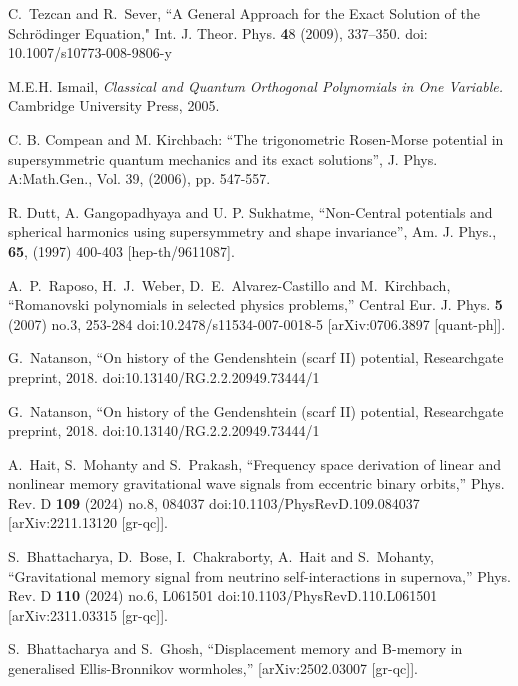 \documentclass[preprint,showpacs,preprintnumbers,amsmath,amssymb,nofootinbib]{revtex4}
\begin{document}
\begin{thebibliography}{99}
C.~Tezcan and R.~Sever, ``A General Approach for the Exact Solution of the Schr\"{o}dinger Equation," Int. J. Theor. Phys. {\textbf 48} (2009), 337–350. 
doi: 10.1007/s10773-008-9806-y

M.E.H. Ismail, {\sl Classical and Quantum Orthogonal Polynomials in One Variable.} Cambridge University Press, 2005.

C. B. Compean and M. Kirchbach: ``The trigonometric Rosen-Morse potential in supersymmetric quantum mechanics and its exact solutions'', J. Phys. A:Math.Gen., Vol. 39, (2006), pp. 547-557.

R. Dutt, A. Gangopadhyaya and U. P. Sukhatme,
``Non-Central potentials and spherical harmonics using supersymmetry and shape invariance'', Am. J. Phys., \textbf{65}, (1997) 400-403 [hep-th/9611087].

A.~P.~Raposo, H.~J.~Weber, D.~E.~Alvarez-Castillo and M.~Kirchbach,
``Romanovski polynomials in selected physics problems,''
Central Eur. J. Phys. \textbf{5} (2007) no.3, 253-284
doi:10.2478/s11534-007-0018-5
[arXiv:0706.3897 [quant-ph]].

G.~Natanson, ``On history of the Gendenshtein (scarf II) potential,
Researchgate preprint, 2018.
doi:10.13140/RG.2.2.20949.73444/1

G.~Natanson, ``On history of the Gendenshtein (scarf II) potential,
Researchgate preprint, 2018.
doi:10.13140/RG.2.2.20949.73444/1


A.~Hait, S.~Mohanty and S.~Prakash,
``Frequency space derivation of linear and nonlinear memory gravitational wave signals from eccentric binary orbits,''
Phys. Rev. D \textbf{109} (2024) no.8, 084037
doi:10.1103/PhysRevD.109.084037
[arXiv:2211.13120 [gr-qc]].

S.~Bhattacharya, D.~Bose, I.~Chakraborty, A.~Hait and S.~Mohanty,
``Gravitational memory signal from neutrino self-interactions in supernova,''
Phys. Rev. D \textbf{110} (2024) no.6, L061501
doi:10.1103/PhysRevD.110.L061501
[arXiv:2311.03315 [gr-qc]].

S.~Bhattacharya and S.~Ghosh,
``Displacement memory and B-memory in generalised Ellis-Bronnikov wormholes,''
[arXiv:2502.03007 [gr-qc]].


\end{thebibliography}
\end{document}
